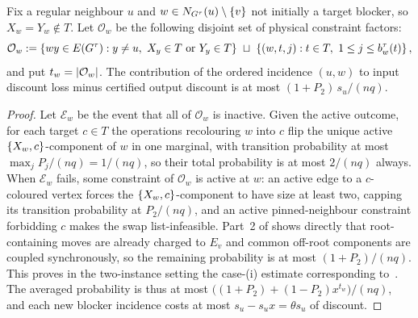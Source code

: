\begin{lemma}\label{lem:cv-incidence}
Fix a regular neighbour $u$ and $w\in N_{G^\tau}(u)\setminus\left\{v\right\}$ not initially
a target blocker, so \(X_w=Y_w\notin T\).  Let \(\mathcal O_w\) be the
following disjoint set of physical constraint factors:
\[
 \mathcal O_w:=
 \left\{wy\in E(G^\tau):y\ne u,\
       X_y\in T\ \text{or}\ Y_y\in T\right\}
 \ \sqcup\
 \left\{(w,t,j):t\in T,\ 1\le j\le b_w^\tau(t)\right\} ,
\]
and put \(t_w=\left|\mathcal O_w\right|\). The contribution of the
ordered incidence $(u,w)$ to input discount loss minus certified output discount
is at most $(1+P_2)\,s_u/(nq)$.
\end{lemma}

\begin{proof}
Let \(\mathcal E_w\) be the event that all of \(\mathcal O_w\) is inactive. Given the
active outcome, for each target $c\in T$ the operations recolouring $w$
into $c$ flip the unique active $\left\{X_w,c\right\}$-component of $w$ in one
marginal, with transition probability at most $\max_jP_j/(nq)=1/(nq)$,
so their total probability is at most $2/(nq)$
always. When \(\mathcal E_w\) fails, some constraint of \(\mathcal O_w\) is active at
$w$: an active edge to a $c$-coloured vertex forces the
$\left\{X_w,c\right\}$-component to have size at least two, capping its transition
probability at $P_2/(nq)$, and an active pinned-neighbour constraint
forbidding $c$ makes the swap list-infeasible. Part~2 of
\Cref{lem:cv-component-budgets} shows directly that root-containing moves
are already charged to $E_v$ and common off-root components are coupled synchronously,
so the remaining probability is at most $(1+P_2)/(nq)$. This proves in the
two-instance setting the case-(i) estimate corresponding
to~\cite[\S4.3]{CarlsonVigoda2024}. The averaged probability is thus at most
\(\bigl((1+P_2)+(1-P_2)x^{t_w}\bigr)/(nq)\), and each new blocker incidence costs at most
$s_u-s_ux=\theta s_u$ of discount.


\end{proof}
